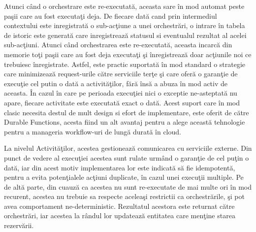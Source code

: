 \par Atunci când o orchestrare este re-executată, aceasta sare în mod automat peste paşii care au fost executaţi deja. De fiecare dată cand prin intermediul contextului este inregistrată o sub-acţiune a unei orchestrări, o intrare în tabela de istoric este generată care inregistrează statusul si eventualul rezultat al acelei sub-acţiuni. Atunci când orchestrarea este re-executată, aceasta incarcă din memorie toţi paşii care au fost deja executaţi şi înregistrează doar acţiunile noi ce trebuiesc înregistrate. Astfel, este practic suportată în mod standard o strategie care minimizează request-urile către serviciile terţe şi care oferă o garanţie de execuţie cel putin o dată a activităţilor, fără însă a abuza în mod activ de aceasta. În cazul în care pe perioada execuţiei nici o exceptie ne-asteptată nu apare, fiecare activitate este executată exact o dată. Acest suport care în mod clasic necesita destul de mult design si efort de implementare, este oferit de către Durable Functions, acesta fiind un alt avantaj pentru a alege această tehnologie pentru a manageria workflow-uri de lungă durată în cloud. 
\par La nivelul Activităţilor, acestea gestionează comunicarea cu serviciile externe. Din punct de vedere al execuţiei acestea sunt rulate urmând o garanţie de cel puţin o dată, iar din acest motiv implementarea lor este indicată să fie idempotentă, pentru a evita potenţialele acţiuni duplicate, în cazul unei execuţii multiple. Pe de altă parte, din cuauză ca acestea nu sunt re-executate de mai multe ori în mod recurent, acestea nu trebuie sa respecte aceleaşi restrictii ca orchestrările, şi pot avea comportament ne-deterministic. Rezultatul acestora este returnat către orchestrări, iar acestea la rândul lor updatează entitatea care menţine starea rezervării. 
